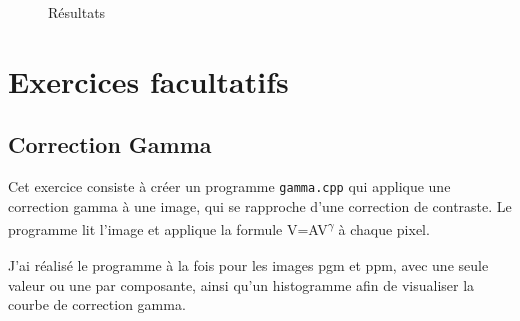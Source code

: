 \documentclass[11pt]{article}
\begin{document}
\begin{figure}[!htb]
  \centering
  \caption{Résultats}
\end{figure}

\FloatBarrier

\clearpage
\section{Exercices facultatifs}
\subsection{Correction Gamma}
Cet exercice consiste à créer un programme \texttt{gamma.cpp} qui applique une correction gamma à une image, qui se rapproche d'une correction de contraste. Le programme lit l'image et applique la formule V\textsubscript{}=AV\textsubscript{}\textsuperscript{\(\gamma\) } à chaque pixel.

J'ai réalisé le programme à la fois pour les images pgm et ppm, avec une seule valeur ou une par composante, ainsi qu'un histogramme afin de visualiser la courbe de correction gamma.
\end{document}
